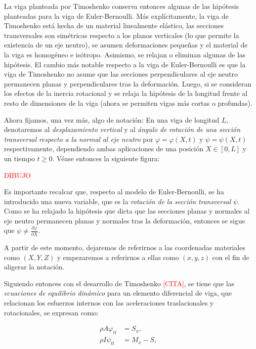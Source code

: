 La viga planteada por Timoshenko conserva entonces algunas de las hipótesis planteadas para la viga de Euler-Bernoulli. Más explícitamente, la viga de Timoshenko está hecha de un material linealmente elástico, las secciones transversales son simétricas respecto a los planos verticales (lo que permite la existencia de un eje neutro), se asumen deformaciones pequeñas y el material de la viga es homogéneo e isótropo. Asimismo, se relajan o eliminan algunas de las hipótesis. El cambio más notable respecto a la viga de Euler-Bernoulli es que la viga de Timoshenko no asume que las secciones perpendiculares al eje neutro permanecen planas y perpendiculares tras la deformación. Luego, si se consideran los efectos de la inercia rotacional y se relaja la hipótesis de la longitud frente al resto de dimensiones de la viga (ahora se permiten vigas más cortas o profundas).

Ahora fijamos, una vez más, algo de notación: En una viga de longitud $L$, denotaremos al \textit{desplazamiento vertical} y al \textit{ángulo de rotación de una sección transversal respecto a la normal al eje neutro} por $\varphi = \varphi(X,t)$ y $\psi = \psi(X,t)$ respectivamente, dependiendo ambas aplicaciones de una posición $X \in [0, L]$ y un tiempo $t \geq 0$. Véase entonces la siguiente figura:

\textcolor{red}{DIBUJO}

Es importante recalcar que, respecto al modelo de Euler-Bernoulli, se ha introducido una nueva variable, que es la \textit{rotación de la sección transversal} $\psi$. Como se ha relajado la hipótesis que dicta que las secciones planas y normales al eje neutro permanecen planas y normales tras la deformación, entonces se sigue que $\psi \neq \frac{\partial \varphi}{\partial X}$. 

A partir de este momento, dejaremos de referirnos a las coordenadas materiales como $(X,Y,Z)$ y empezaremos a referirnos a ellas como $(x,y,z)$ con el fin de aligerar la notación. 

Siguiendo entonces con el desarrollo de Timoshenko \textcolor{red}{[CITA]}, se tiene que las \textit{ecuaciones de equilibrio dinámico} para un elemento diferencial de viga, que relacionan los esfuerzos internos con las aceleraciones traslacionales y rotacionales, se expresan como:

\begin{align}
    \rho A \varphi_{tt} &= S_x, \label{timoshenkoBasico:equilDinamicoCortante}\\
    \rho I \psi_{tt} &= M_x - S, \label{timoshenkoBasico:equilDinamicoFlector}
\end{align}

